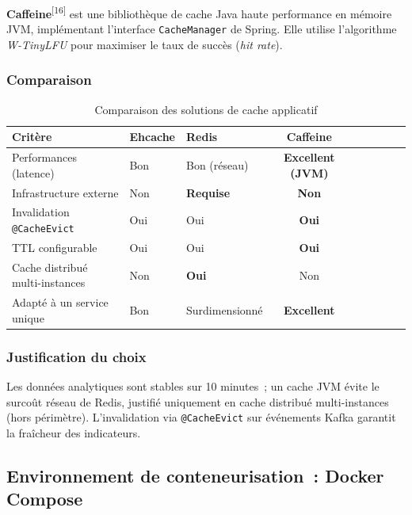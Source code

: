 \textbf{Caffeine}\textsuperscript{[16]} est une bibliothèque de cache Java haute performance en mémoire
JVM, implémentant l'interface \texttt{CacheManager} de Spring. Elle utilise
l'algorithme \textit{W-TinyLFU} pour maximiser le taux de succès (\textit{hit rate}).

\subsubsection*{Comparaison}

\begin{table}[H]
\centering
\caption{Comparaison des solutions de cache applicatif}
\label{tab:cmp_cache}
\begin{tabularx}{\textwidth}{VlVCVCVCV}
\hline
\textbf{Critère} & \textbf{Ehcache} & \textbf{Redis} & \textbf{Caffeine} \\
\hline
Performances (latence)       & Bon      & Bon (réseau) & \textbf{Excellent (JVM)} \\
\hline
Infrastructure externe       & Non      & \textbf{Requise} & \textbf{Non} \\
\hline
Invalidation \texttt{@CacheEvict} & Oui & Oui & \textbf{Oui} \\
\hline
TTL configurable             & Oui      & Oui          & \textbf{Oui} \\
\hline
Cache distribué multi-instances & Non   & \textbf{Oui} & Non \\
\hline
Adapté à un service unique   & Bon      & Surdimensionné & \textbf{Excellent} \\
\hline
\end{tabularx}
\end{table}

\subsubsection*{Justification du choix}

Les données analytiques sont stables sur 10 minutes~; un cache JVM évite le surcoût réseau de Redis, justifié uniquement en cache distribué multi-instances (hors périmètre). L'invalidation via \texttt{@CacheEvict} sur événements Kafka garantit la fraîcheur des indicateurs.

\subsection{Environnement de conteneurisation~: Docker Compose}

